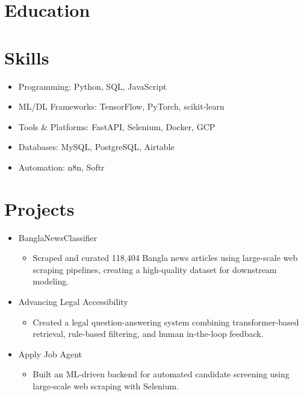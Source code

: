 \documentclass[11pt,a4paper,sans]{moderncv}
\begin{document}
\section{Education}

\section{Skills}
\begin{itemize}
    \item Programming: Python, SQL, JavaScript
    \item ML/DL Frameworks: TensorFlow, PyTorch, scikit-learn
    \item Tools \& Platforms: FastAPI, Selenium, Docker, GCP
    \item Databases: MySQL, PostgreSQL, Airtable
    \item Automation: n8n, Softr
\end{itemize}

\section{Projects}
\begin{itemize}
    \item BanglaNewsClassifier
    \begin{itemize}
        \item Scraped and curated 118,404 Bangla news articles using large-scale web scraping pipelines, creating a high-quality dataset for downstream modeling.
    \end{itemize}
    \item Advancing Legal Accessibility
    \begin{itemize}
        \item Created a legal question-answering system combining transformer-based retrieval, rule-based filtering, and human in-the-loop feedback.
    \end{itemize}
    \item Apply Job Agent
    \begin{itemize}
        \item Built an ML-driven backend for automated candidate screening using large-scale web scraping with Selenium.
    \end{itemize}
\end{itemize}
\end{document}
